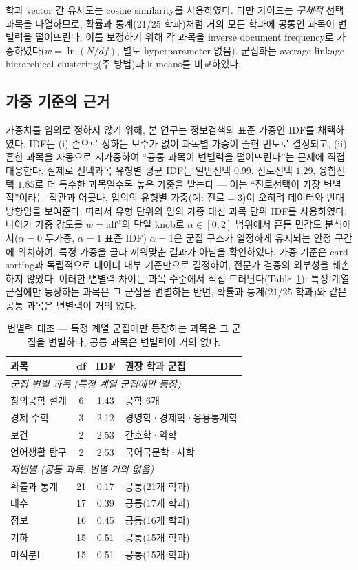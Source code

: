 \documentclass[conference]{IEEEtran}
\begin{document}
학과 vector 간 유사도는 cosine similarity를 사용하였다.
다만 가이드는 \emph{구체적} 선택과목을 나열하므로, 확률과 통계(21/25 학과)처럼 거의 모든 학과에 공통인 과목이 변별력을 떨어뜨린다.
이를 보정하기 위해 각 과목을 inverse document frequency로 가중하였다($w=\ln(N/df)$, 별도 hyperparameter 없음).
군집화는 average linkage hierarchical clustering(주 방법)과 k-means를 비교하였다.

\subsection{가중 기준의 근거}

가중치를 임의로 정하지 않기 위해, 본 연구는 정보검색의 표준 가중인 IDF를 채택하였다.
IDF는 (i) 손으로 정하는 모수가 없이 과목별 가중이 출현 빈도로 결정되고, (ii) 흔한 과목을 자동으로 저가중하여 ``공통 과목이 변별력을 떨어뜨린다''는 문제에 직접 대응한다.
실제로 선택과목 유형별 평균 IDF는 일반선택 $0.99$, 진로선택 $1.29$, 융합선택 $1.85$로 더 특수한 과목일수록 높은 가중을 받는다 --- 이는 ``진로선택이 가장 변별적''이라는 직관과 어긋나, 임의의 유형별 가중(예: 진로$=3$)이 오히려 데이터와 반대 방향임을 보여준다.
따라서 유형 단위의 임의 가중 대신 과목 단위 IDF를 사용하였다.
나아가 가중 강도를 $w=\mathrm{idf}^{\alpha}$의 단일 knob로 $\alpha\!\in\![0,2]$ 범위에서 흔든 민감도 분석에서($\alpha=0$ 무가중, $\alpha=1$ 표준 IDF) $\alpha=1$은 군집 구조가 일정하게 유지되는 안정 구간에 위치하여, 특정 가중을 골라 끼워맞춘 결과가 아님을 확인하였다.
가중 기준은 card sorting과 독립적으로 데이터 내부 기준만으로 결정하여, 전문가 검증의 외부성을 훼손하지 않았다.
이러한 변별력 차이는 과목 수준에서 직접 드러난다(Table~\ref{tab:discriminative}): 특정 계열 군집에만 등장하는 과목은 그 군집을 변별하는 반면, 확률과 통계(21/25 학과)와 같은 공통 과목은 변별력이 거의 없다.

\begin{table}[!ht]
\centering
\caption{변별력 대조 --- 특정 계열 군집에만 등장하는 과목은 그 군집을 변별하나, 공통 과목은 변별력이 거의 없다.}
\label{tab:discriminative}
\begin{tabular}{lccl}
\hline
과목 & df & IDF & 권장 학과 군집 \\
\hline
\multicolumn{4}{l}{\textit{군집 변별 과목 (특정 계열 군집에만 등장)}} \\
창의공학 설계 & 6 & 1.43 & 공학 6개 \\
경제 수학 & 3 & 2.12 & 경영학·경제학·응용통계학 \\
보건 & 2 & 2.53 & 간호학·약학 \\
언어생활 탐구 & 2 & 2.53 & 국어국문학·사학 \\
\hline
\multicolumn{4}{l}{\textit{저변별 (공통 과목, 변별 거의 없음)}} \\
확률과 통계 & 21 & 0.17 & 공통(21개 학과) \\
대수 & 17 & 0.39 & 공통(17개 학과) \\
정보 & 16 & 0.45 & 공통(16개 학과) \\
기하 & 15 & 0.51 & 공통(15개 학과) \\
미적분Ⅰ & 15 & 0.51 & 공통(15개 학과) \\
\hline
\end{tabular}
\end{table}
\end{document}
